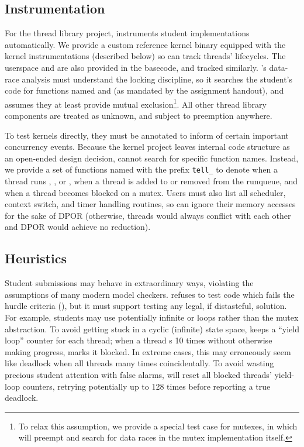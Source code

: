 \subsection{Instrumentation}

For the thread library project, \landslide instruments student implementations automatically.
We provide a custom reference kernel binary equipped with the kernel instrumentations (described below)
so \landslide can track threads' lifecycles. %
The userspace  and  are also provided in the basecode, and tracked similarly.
\landslide's data-race analysis must understand the locking discipline,
so it searches the student's code for functions named  and  (as mandated by the assignment handout),
and assumes they at least provide mutual exclusion\footnote{
	To relax this assumption, we provide a special test case for mutexes,
	in which \landslide will preempt and search for data races in the mutex implementation itself.
}.
All other thread library components are treated as unknown, and subject to preemption anywhere.

To test \pebbles kernels directly, they must be annotated to inform \landslide of certain important concurrency events.
Because the kernel project leaves internal code structure as an open-ended design decision,
\landslide cannot search for specific function names. %
Instead, we provide a set of functions named with the prefix
\texttt{tell\_\landslide}
to denote when a thread runs , , or , when a thread is added to or removed from the runqueue, and when a thread becomes blocked on a mutex.
Users must also list all scheduler, context switch, and timer handling routines, so \landslide can ignore their memory accesses for the sake of DPOR
(otherwise, threads would always conflict with each other and DPOR would achieve no reduction).

\subsection{Heuristics}

Student submissions may behave in extraordinary ways, violating the assumptions of many modern model checkers.
\landslide refuses to test code which fails the hurdle criteria (\sect{\ref{sec:grading}}),
but it must support testing any legal, if distasteful, solution.
For example, students may use potentially infinite  or  loops rather than the mutex abstraction. %
To avoid getting stuck in a cyclic (infinite) state space, \landslide keeps a ``yield loop'' counter for each thread;
when a thread s 10 times without otherwise making progress, \landslide marks it blocked.
%
In extreme cases, this may erroneously seem like deadlock when all threads  many times coincidentally.
To avoid wasting precious student attention with false alarms, %
\landslide will reset all blocked threads' yield-loop counters,
retrying potentially up to 128 times before reporting a true deadlock.

